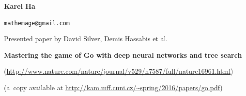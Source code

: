 \documentclass[a4paper,10pt]{article}
\begin{document}
\def\speaker#1#2{                                   
  \centerline{\Large \textbf{#1}}\vskip1pt                
  \centerline{\tt #2} }                                                                          
\def\title#1{\medskip\centerline{\Large \textbf{#1}}}
\def\author#1{\smallskip\centerline{Presented paper by #1}}                                                       
\def\source#1{\smallskip\centerline{(#1)}}
\def\endtitle{\par\medskip}
\newenvironment{definition}{\stepcounter{Defnum}\par\textbf{Definition \arabic{Defnum}.}} {}
\newenvironment{theorem}{\stepcounter{Defnum}\par\textbf{Theorem \arabic{Defnum}.}\it}{}
\newenvironment{lemma}{\stepcounter{Defnum}\par\textbf{Lemma \arabic{Defnum}.}\it}{}
\newenvironment{exercise}{\stepcounter{Defnum}\par\textbf{Exercise \arabic{Defnum}.}\it}{}
\newenvironment{observation}{\stepcounter{Defnum}\par\textbf{Observation \arabic{Defnum}.}\it}{}
\newenvironment{corollary}{\stepcounter{Defnum}\par\textbf{Corollary \arabic{Defnum}.}\it}{}
\newenvironment{conjecture}{\stepcounter{Defnum}\par\textbf{Conjecture \arabic{Defnum}.}\it}{}
\setlength{\parindent}{0pt}
\setlength{\parskip}{0.5 em}
\def\subsection#1{\par Not good idea. \smallskip}
\def\section#1{\par\medskip\centerline{\bf #1}\smallskip}
\def\cite#1{Don't use cite.}

\newcommand{\todo}{\textbf{TODO}}

\speaker{Karel Ha}{mathemage@gmail.com}
\author{David Silver, Demis Hassabis et al.}%
\title{Mastering the game of Go with deep neural networks and tree search}
\source{\url{http://www.nature.com/nature/journal/v529/n7587/full/nature16961.html}}
\source{a~copy available at \url{http://kam.mff.cuni.cz/~spring/2016/papers/go.pdf}}
\endtitle
\end{document}
